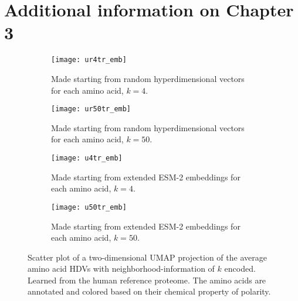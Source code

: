 \chapter{Additional information on Chapter 3}\label{app:chp3}
\begin{figure}[h!]
    \centering
    \begin{subfigure}{0.48\textwidth}
        \texttt{[image: ur4tr\_emb]}
        \caption{Made starting from random hyperdimensional vectors for each amino acid, $k=4$.}
        \label{fig:AAtr4ru}
    \end{subfigure}
    \hfill
    \begin{subfigure}{0.48\textwidth}
        \texttt{[image: ur50tr\_emb]}
        \caption{Made starting from random hyperdimensional vectors for each amino acid, $k=50$.}
        \label{fig:AAtr50ru}
    \end{subfigure}
    
    \begin{subfigure}{0.48\textwidth}
        \texttt{[image: u4tr\_emb]}
        \caption{Made starting from extended ESM-2 embeddings for each amino acid, $k=4$.}
        \label{fig:AAtr4u}
    \end{subfigure}
    \hfill
    \begin{subfigure}{0.48\textwidth}
        \texttt{[image: u50tr\_emb]}
        \caption{Made starting from extended ESM-2 embeddings for each amino acid, $k=50$.}
        \label{fig:AAtr50u}
    \end{subfigure}
    \caption{Scatter plot of a two-dimensional UMAP projection of the average amino acid HDVs with neighborhood-information of $k$ encoded. Learned from the human reference proteome. The amino acids are annotated and colored based on their chemical property of polarity.}
    \label{fig:main3}
\end{figure}

